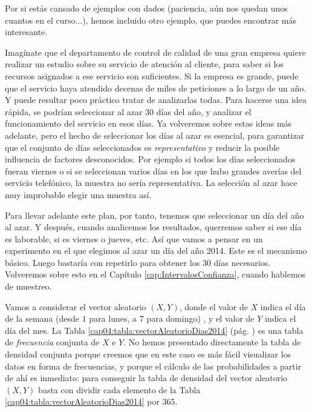\noindent Por si estás cansado de ejemplos con dados (paciencia, aún nos quedan unos cuantos en el curso...), hemos incluido otro ejemplo, que puedes encontrar más interesante.
\begin{ejemplo}
\label{cap04:ejem:vectorAleatorioDias2014}
Imagínate que el departamento de control de calidad de una gran empresa quiere realizar un estudio sobre su servicio de atención al cliente, para saber si los recursos asignados a ese servicio son suficientes. Si la empresa es grande, puede que el servicio haya atendido decenas de miles de peticiones a lo largo de un año. Y puede resultar poco práctico tratar de analizarlas todas. Para hacerse una idea rápida, se podrían seleccionar  al azar $30$ días del año, y analizar el funcionamiento del servicio en esos días. Ya volveremos sobre estas ideas más adelante, pero el hecho de seleccionar los días al azar es esencial, para garantizar que el conjunto de días seleccionados  es {\em representativo} y reducir la posible influencia de factores desconocidos. Por ejemplo si todos los días seleccionados fueran viernes o si se seleccionan varios días en los que hubo grandes averías del servicio telefónico, la muestra no sería representativa. La selección al azar hace muy improbable elegir una muestra así.   

Para llevar adelante este plan, por tanto, tenemos que seleccionar un día del año al azar. Y después, cuando analicemos los resultados, querremos saber si ese día es laborable, si es viernes o jueves, etc.  Así que vamos a pensar en un experimento en el que elegimos al azar un día del año 2014. Este es el mecanismo básico. Luego bastaría con repetirlo para obtener los 30 días necesarios. Volveremos sobre esto en el Capítulo \ref{cap:IntervalosConfianza}, cuando hablemos de muestreo.

Vamos a considerar el vector aleatorio $(X,Y)$, donde el valor de $X$ indica el día de la semana (desde $1$ para lunes, a $7$ para domingo) , y el valor de $Y$ indica el día del mes. La Tabla \ref{cap04:tabla:vectorAleatorioDias2014} (pág. \pageref{cap04:tabla:vectorAleatorioDias2014}) es una tabla de {\em frecuencia} conjunta de $X$ e $Y$.  No hemos presentado directamente la tabla de densidad conjunta porque creemos que en este caso es más fácil visualizar los datos en forma de frecuencias, y porque el cálculo  de las probabilidades a partir de ahí es inmediato: para conseguir la tabla de densidad del vector aleatorio $(X,Y)$ basta con dividir cada elemento de la Tabla \ref{cap04:tabla:vectorAleatorioDias2014} por $365$.


\end{ejemplo}

